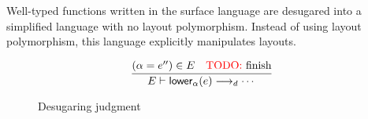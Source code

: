 Well-typed functions written in the surface language
are desugared into a simplified language with no layout polymorphism. Instead of using layout polymorphism, this language explicitly manipulates layouts.


\begin{figure}
  \[
    \labinfer{E \vdash \apply_\alpha(e) \desugars \cdots}{(\alpha = e'') \in E & \textrm{{\color{red}TODO:} finish}}
  \]
  \caption{Desugaring judgment}
  \label{fig:desugaring}
\end{figure}
